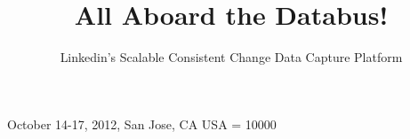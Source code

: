 \documentclass{sig-alternate11pt1col}
\begin{document}
 {October 14-17, 2012, San Jose, CA USA} 
\widowpenalty = 10000

\title{All Aboard the Databus!}
\subtitle{Linkedin's Scalable Consistent Change Data Capture Platform}
%
%
%
%
%

\def\sharedaffiliation{%
\end{tabular}
\begin{tabular}{c}}
\end{document}
